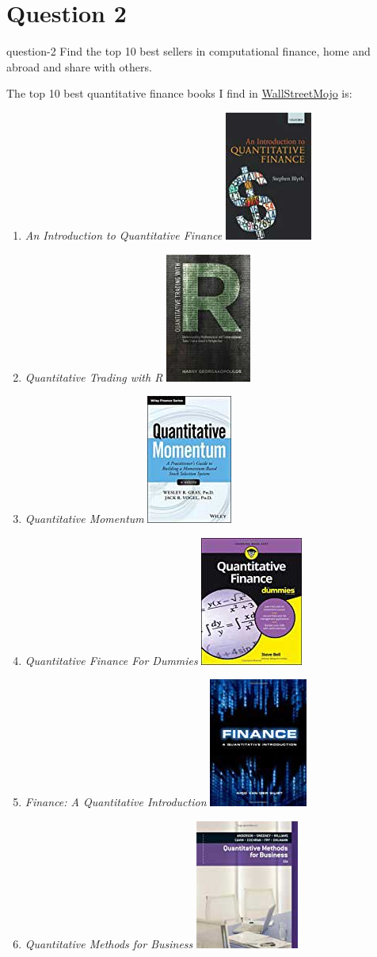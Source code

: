 \section{Question 2}\label{S:2}
\begin{statebox}{}{question-2}
    Find the top 10 best sellers in computational finance, home and abroad and share with others.
\end{statebox}
The top 10 best quantitative finance books I find in \href{https://www.wallstreetmojo.com/top-best-quantitative-finance-books/}{WallStreetMojo} is:\cite{Dheeraj2016finace-books}
\begin{enumerate}
    \item \emph{An Introduction to Quantitative Finance}
        \hfill\includegraphics[height=.5in]{figures/2019-09-17-finance-books-1.jpg}
    \item \emph{Quantitative Trading with R}
        \hfill\includegraphics[height=.5in]{figures/2019-09-17-finance-books-2.jpg}
    \item \emph{Quantitative Momentum}
        \hfill\includegraphics[height=.5in]{figures/2019-09-17-finance-books-3.jpg}
    \item \emph{Quantitative Finance For Dummies}
        \hfill\includegraphics[height=.5in]{figures/2019-09-17-finance-books-4.jpg}
    \item \emph{Finance: A Quantitative Introduction}
        \hfill\includegraphics[height=.5in]{figures/2019-09-17-finance-books-5.jpg}
    \item \emph{Quantitative Methods for Business}
        \hfill\includegraphics[height=.5in]{figures/2019-09-17-finance-books-6.jpg}

\end{enumerate}
